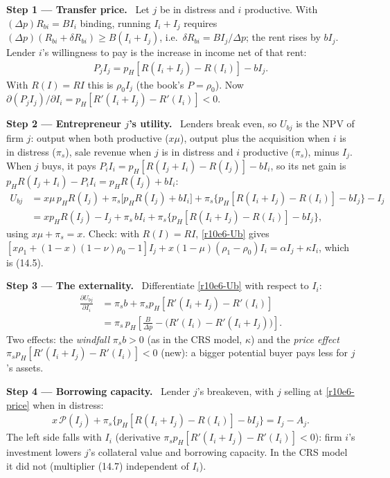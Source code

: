 \documentclass[11pt,a4paper]{article}
\newcommand{\step}[2]{\par\medskip\noindent\textbf{Step #1 --- #2.}~}
\newcommand{\Pc}{\mathcal{P}}
\begin{document}
\step{1}{Transfer price} Let $j$ be in distress and $i$ productive. With $(\Delta p)R_{bi}=BI_i$ binding, running $I_i+I_j$ requires $(\Delta p)(R_{bi}+\delta R_{bi})\geq B(I_i+I_j)$, i.e.\ $\delta R_{bi}=BI_j/\Delta p$; the rent rises by $bI_j$. Lender $i$'s willingness to pay is the increase in income net of that rent:
\begin{align}
  P_jI_j = p_H[R(I_i+I_j)-R(I_i)]-bI_j. \label{r10e6-price}
\end{align}
With $R(I)=RI$ this is $\rho_0I_j$ (the book's $P=\rho_0$). Now $\partial(P_jI_j)/\partial I_i=p_H[R'(I_i+I_j)-R'(I_i)]<0$.

\step{2}{Entrepreneur $j$'s utility} Lenders break even, so $U_{bj}$ is the NPV of firm $j$: output when both productive ($x\mu$), output plus the acquisition when $i$ is in distress ($\pi_s$), sale revenue when $j$ is in distress and $i$ productive ($\pi_s$), minus $I_j$. When $j$ buys, it pays $P_iI_i=p_H[R(I_j+I_i)-R(I_j)]-bI_i$, so its net gain is $p_HR(I_j+I_i)-P_iI_i=p_HR(I_j)+bI_i$:
\begin{align}
  U_{bj} &= x\mu\,p_HR(I_j)+\pi_s\bigl[p_HR(I_j)+bI_i\bigr]+\pi_s\bigl\{p_H[R(I_i+I_j)-R(I_i)]-bI_j\bigr\}-I_j \nonumber\\
         &= xp_HR(I_j)-I_j+\pi_s\,bI_i+\pi_s\bigl\{p_H[R(I_i+I_j)-R(I_i)]-bI_j\bigr\}, \label{r10e6-Ub}
\end{align}
using $x\mu+\pi_s=x$. Check: with $R(I)=RI$, \eqref{r10e6-Ub} gives $[x\rho_1+(1-x)(1-\nu)\rho_0-1]I_j+x(1-\mu)(\rho_1-\rho_0)I_i=\alpha I_j+\kappa I_i$, which is (14.5).

\step{3}{The externality} Differentiate \eqref{r10e6-Ub} with respect to $I_i$:
\begin{align}
  \frac{\partial U_{bj}}{\partial I_i} &= \pi_s b+\pi_s p_H[R'(I_i+I_j)-R'(I_i)] \nonumber\\
  &= \pi_s\,p_H\left[\frac{B}{\Delta p}-\bigl(R'(I_i)-R'(I_i+I_j)\bigr)\right]. \label{r10e6-ext}
\end{align}
Two effects: the \emph{windfall} $\pi_sb>0$ (as in the CRS model, $\kappa$) and the \emph{price effect} $\pi_sp_H[R'(I_i+I_j)-R'(I_i)]<0$ (new): a bigger potential buyer pays less for $j$'s assets.

\step{4}{Borrowing capacity} Lender $j$'s breakeven, with $j$ selling at \eqref{r10e6-price} when in distress:
\begin{align}
  x\,\Pc(I_j)+\pi_s\bigl\{p_H[R(I_i+I_j)-R(I_i)]-bI_j\bigr\} = I_j-A_j. \label{r10e6-bc}
\end{align}
The left side falls with $I_i$ (derivative $\pi_sp_H[R'(I_i+I_j)-R'(I_i)]<0$): firm $i$'s investment lowers $j$'s collateral value and borrowing capacity. In the CRS model it did not (multiplier (14.7) independent of $I_i$).
\end{document}
